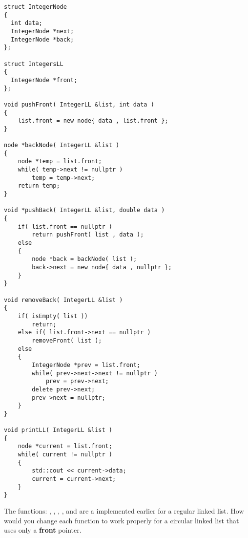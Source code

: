 \documentclass[usenames,dvipsnames]{article}
\begin{document}
\begin{verbatim}
struct IntegerNode
{
  int data;
  IntegerNode *next;
  IntegerNode *back;
};

struct IntegersLL
{
  IntegerNode *front;
};

void pushFront( IntegerLL &list, int data )
{
    list.front = new node{ data , list.front };
}

node *backNode( IntegerLL &list )
{
    node *temp = list.front;
    while( temp->next != nullptr )
        temp = temp->next;
    return temp;
}

void *pushBack( IntegerLL &list, double data )
{
    if( list.front == nullptr )
        return pushFront( list , data );
    else
    {
        node *back = backNode( list );
        back->next = new node{ data , nullptr };
    }
}

void removeBack( IntegerLL &list )
{ 
    if( isEmpty( list ))
        return;
    else if( list.front->next == nullptr )
        removeFront( list );
    else
    {
        IntegerNode *prev = list.front;
        while( prev->next->next != nullptr )
            prev = prev->next;
        delete prev->next;
        prev->next = nullptr;
    }
}

void printLL( IntegerLL &list )
{
    node *current = list.front;
    while( current != nullptr )
    {
        std::cout << current->data;
        current = current->next;
    }
}
\end{verbatim}


\begin{question}
The functions: , , , , and  are a implemented earlier for a regular linked list.
How would you change each function to work properly for a circular linked list that uses only a \textbf{front} pointer.
\end{question}

\begin{solution}

\end{solution}
\end{document}
